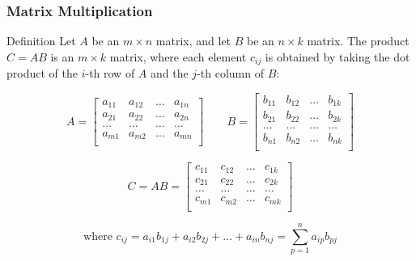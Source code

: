 \documentclass{beamer}
\begin{document}
\begin{frame}
  \frametitle{Matrix Multiplication}

  \begin{block}{Definition}
    Let \(A\) be an \(m \times n\) matrix, and let \(B\) be an \(n \times k\) matrix. The product \(C = AB\) is an \(m \times k\) matrix, where each element \(c_{ij}\) is obtained by taking the dot product of the \(i\)-th row of \(A\) and the \(j\)-th column of \(B\):

\[
      A = \begin{bmatrix}
        a_{11} & a_{12} & \ldots & a_{1n} \\
        a_{21} & a_{22} & \ldots & a_{2n} \\
        \dots & \dots & \dots & \dots \\        a_{m1} & a_{m2} & \ldots & a_{mn} \\
      \end{bmatrix}
      \qquad
      B = \begin{bmatrix}
        b_{11} & b_{12} & \ldots & b_{1k} \\
        b_{21} & b_{22} & \ldots & b_{2k} \\
        \dots & \dots & \dots & \dots \\        b_{n1} & b_{n2} & \ldots & b_{nk} \\
      \end{bmatrix}
    \]

    \[
      C = AB = \begin{bmatrix}
        c_{11} & c_{12} & \ldots & c_{1k} \\
        c_{21} & c_{22} & \ldots & c_{2k} \\
        \dots & \dots & \dots & \dots \\
        c_{m1} & c_{m2} & \ldots & c_{mk} \\
      \end{bmatrix}
    \]

    \[
      \text{where }c_{ij} = a_{i1}b_{1j} + a_{i2}b_{2j} + \ldots + a_{in}b_{nj}= \sum_{p=1}^{n} a_{ip}b_{pj}
    \]
    
  \end{block}

\end{frame}




\end{document}
